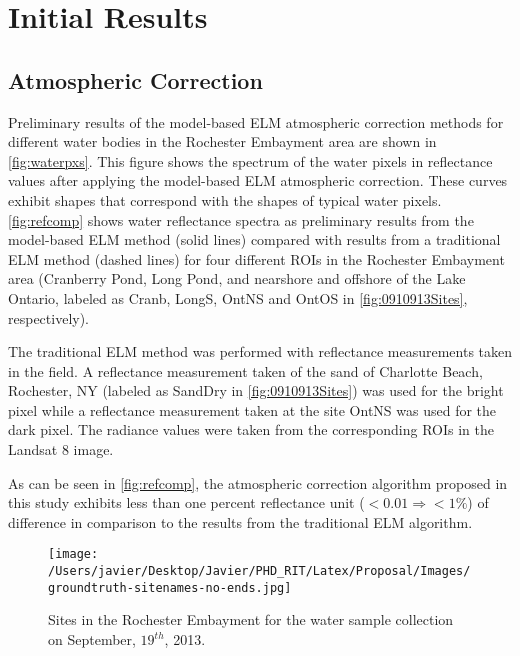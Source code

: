 \chapter{Initial Results}
\section{Atmospheric Correction}

Preliminary results of the model-based ELM atmospheric correction methods for different water bodies in the Rochester Embayment area are shown in \autoref{fig:waterpxs}. This figure shows the spectrum of the water pixels in reflectance values after applying the model-based ELM atmospheric correction. These curves exhibit shapes that correspond with the shapes of typical water pixels. \autoref{fig:refcomp} shows water reflectance spectra as preliminary results from the model-based ELM method (solid lines) compared with results from a traditional ELM method (dashed lines) for four different ROIs in the Rochester Embayment area (Cranberry Pond, Long Pond, and nearshore and offshore of the Lake Ontario, labeled as Cranb, LongS, OntNS and OntOS in \autoref{fig:0910913Sites}, respectively). 

The traditional ELM method was performed with reflectance measurements taken in the field. A reflectance measurement taken of the sand of Charlotte Beach, Rochester, NY (labeled as SandDry in \autoref{fig:0910913Sites}) was used for the bright pixel while a reflectance measurement taken at the site OntNS was used for the dark pixel. The radiance values were taken from the corresponding ROIs in the Landsat 8 image. 

As can be seen in \autoref{fig:refcomp}, the atmospheric correction algorithm proposed in this study exhibits less than one percent reflectance unit ($<0.01\Rightarrow <1\%$) of difference in comparison to the results from the traditional ELM algorithm.

\begin{figure}[!ht]
  \centering
  \texttt{[image: /Users/javier/Desktop/Javier/PHD\_RIT/Latex/Proposal/Images/groundtruth-sitenames-no-ends.jpg]}
  \caption{Sites in the Rochester Embayment for the water sample collection on September, $19^{th}$, 2013.\label{fig:0910913Sites} } 
  \vspace{1cm}
\end{figure}


